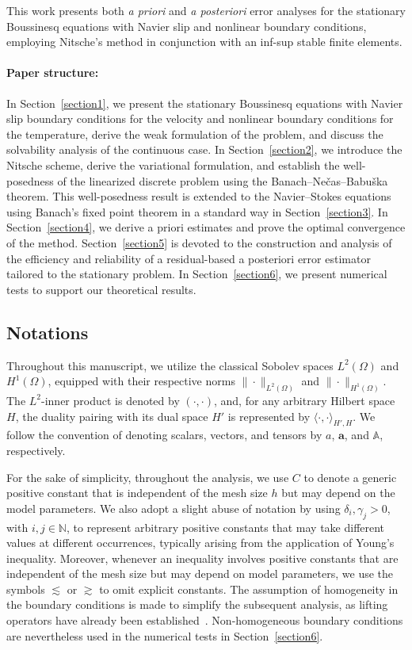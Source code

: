 \documentclass[10pt,a4paper]{article}
\begin{document}
This work presents both \emph{a priori} and \emph{a posteriori} error analyses for the stationary Boussinesq equations with Navier slip and nonlinear boundary conditions, employing Nitsche’s method in conjunction with an inf-sup stable finite elements. 

\paragraph{Paper structure: } In Section~\ref{section1}, we present the stationary Boussinesq equations with Navier slip boundary conditions for the velocity and nonlinear boundary conditions for the temperature, derive the weak formulation of the problem, and discuss the solvability analysis of the continuous case. In Section~\ref{section2}, we introduce the Nitsche scheme, derive the variational formulation, and establish the well-posedness of the linearized discrete problem using the Banach–Ne\v{c}as–Babu\v{s}ka theorem. This well-posedness result is extended to the Navier–Stokes equations using Banach’s fixed point theorem in a standard way in Section~\ref{section3}. In Section~\ref{section4}, we derive a priori estimates and prove the optimal convergence of the method. Section~\ref{section5} is devoted to the construction and analysis of the efficiency and reliability of a residual-based a posteriori error estimator tailored to the stationary problem. In Section~\ref{section6}, we present numerical tests to support our theoretical results.

\subsection*{Notations}
Throughout this manuscript, we utilize the classical Sobolev spaces $L^2(\Omega)$ and $H^1(\Omega)$, equipped with their respective norms $\|\cdot\|_{L^2(\Omega)}$ and $\|\cdot\|_{H^1(\Omega)}$. The $L^2$-inner product is denoted by $(\cdot, \cdot)$, and, for any arbitrary Hilbert space $H$, the duality pairing with its dual space $H'$ is represented by $\langle\cdot, \cdot\rangle_{H', H}$. We follow the convention of denoting scalars, vectors, and tensors by $a$, $\boldsymbol{a}$, and $\mathbb{A}$, respectively. 

For the sake of simplicity, throughout the analysis, we use $C$ to denote a generic positive constant that is independent of the mesh size $h$ but may depend on the model parameters. We also adopt a slight abuse of notation by using $\delta_i, \gamma_j > 0$, with $i,j \in \mathbb{N}$, to represent arbitrary positive constants that may take different values at different occurrences, typically arising from the application of Young's inequality. Moreover, whenever an inequality involves positive constants that are independent of the mesh size but may depend on model parameters, we use the symbols $\lesssim$ or $\gtrsim$ to omit explicit constants. The assumption of homogeneity in the boundary conditions is made to simplify the subsequent analysis, as lifting operators have already been established~\cite{MR3974685}. Non-homogeneous boundary conditions are nevertheless used in the numerical tests in Section~\ref{section6}.
\end{document}
